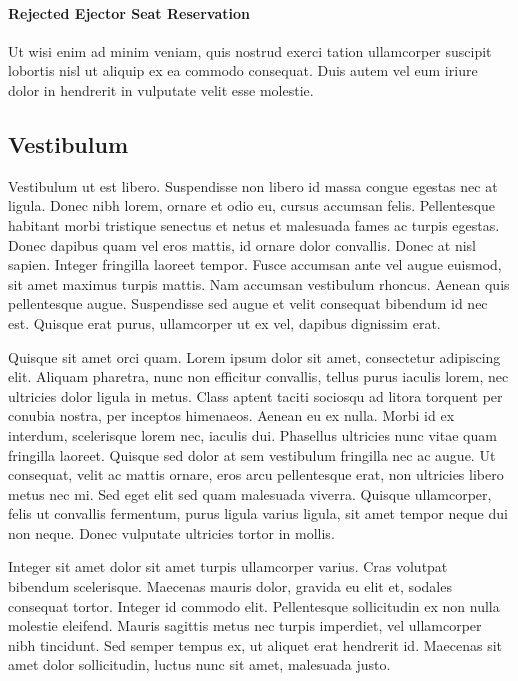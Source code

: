 \documentclass[journal]{vgtc}                %
\begin{document}
\paragraph{Rejected Ejector Seat Reservation}

Ut wisi enim ad minim veniam, quis nostrud exerci tation ullamcorper suscipit lobortis nisl ut aliquip ex ea commodo consequat.
Duis autem vel eum iriure dolor in hendrerit in vulputate velit esse molestie.

\subsection{Vestibulum}

Vestibulum ut est libero.
Suspendisse non libero id massa congue egestas nec at ligula.
Donec nibh lorem, ornare et odio eu, cursus accumsan felis.
Pellentesque habitant morbi tristique senectus et netus et malesuada fames ac turpis egestas.
Donec dapibus quam vel eros mattis, id ornare dolor convallis.
Donec at nisl sapien.
Integer fringilla laoreet tempor.
Fusce accumsan ante vel augue euismod, sit amet maximus turpis mattis.
Nam accumsan vestibulum rhoncus.
Aenean quis pellentesque augue.
Suspendisse sed augue et velit consequat bibendum id nec est.
Quisque erat purus, ullamcorper ut ex vel, dapibus dignissim erat.

Quisque sit amet orci quam.
Lorem ipsum dolor sit amet, consectetur adipiscing elit.
Aliquam pharetra, nunc non efficitur convallis, tellus purus iaculis lorem, nec ultricies dolor ligula in metus.
Class aptent taciti sociosqu ad litora torquent per conubia nostra, per inceptos himenaeos.
Aenean eu ex nulla.
Morbi id ex interdum, scelerisque lorem nec, iaculis dui.
Phasellus ultricies nunc vitae quam fringilla laoreet.
Quisque sed dolor at sem vestibulum fringilla nec ac augue.
Ut consequat, velit ac mattis ornare, eros arcu pellentesque erat, non ultricies libero metus nec mi.
Sed eget elit sed quam malesuada viverra.
Quisque ullamcorper, felis ut convallis fermentum, purus ligula varius ligula, sit amet tempor neque dui non neque.
Donec vulputate ultricies tortor in mollis.

Integer sit amet dolor sit amet turpis ullamcorper varius.
Cras volutpat bibendum scelerisque.
Maecenas mauris dolor, gravida eu elit et, sodales consequat tortor.
Integer id commodo elit.
Pellentesque sollicitudin ex non nulla molestie eleifend.
Mauris sagittis metus nec turpis imperdiet, vel ullamcorper nibh tincidunt.
Sed semper tempus ex, ut aliquet erat hendrerit id.
Maecenas sit amet dolor sollicitudin, luctus nunc sit amet, malesuada justo.
\end{document}
